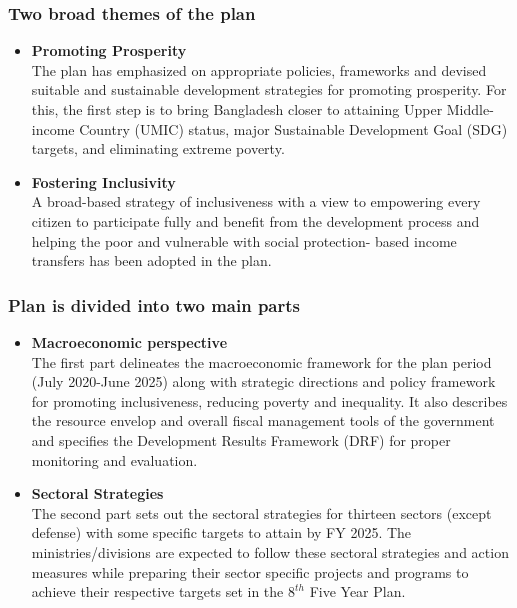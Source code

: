 \subsubsection{Two broad themes of the plan}
\begin{itemize}
	\item\textbf{Promoting Prosperity}\\
	The plan has emphasized on appropriate policies, frameworks and devised 
	suitable and sustainable development strategies for promoting prosperity. 
	For this, the first step is to bring Bangladesh closer to attaining 
	Upper Middle-income Country (UMIC) status, major Sustainable Development Goal (SDG) 
	targets, and eliminating extreme poverty.
	
	\item\textbf{Fostering Inclusivity}\\
	A broad-based strategy of inclusiveness with a view to empowering every citizen 
	to participate fully and benefit from the development process and helping the poor and 
	vulnerable with social protection- based income transfers has been adopted in the plan.
\end{itemize}

\subsubsection{Plan is divided into two main parts}
\begin{itemize}
	\item\textbf{Macroeconomic perspective}\\
	The first part delineates the macroeconomic framework for the plan period 
	(July 2020-June 2025) along with strategic directions and policy framework 
	for promoting inclusiveness, reducing poverty and inequality. It also describes 
	the resource envelop and overall fiscal management tools of the government 
	and specifies the Development Results Framework (DRF) for proper monitoring and evaluation.
	
	\item\textbf{Sectoral Strategies}\\
	The second part sets out the sectoral strategies for thirteen sectors (except defense) 
	with some specific targets to attain by FY 2025. The ministries/divisions are expected 
	to follow these sectoral strategies and action measures while preparing their sector 
	specific projects and programs to achieve their respective targets set in the $8^{th}$ Five Year Plan.
\end{itemize}

